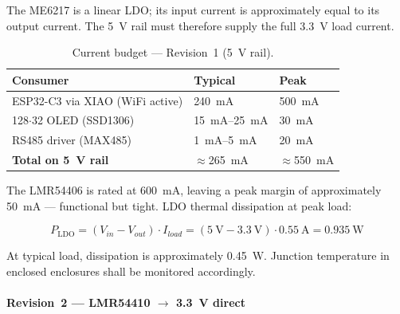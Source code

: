 The ME6217 is a linear \ac{LDO}; its input current is approximately equal to its output current.
The \SI{5}{\volt} rail must therefore supply the full \SI{3.3}{\volt} load current.

\begin{table}[H]
  \caption{Current budget — Revision~1 (\SI{5}{\volt} rail).}
  \label{tab:current_rev1}
  \centering
  \begin{tabularx}{\textwidth}{|X|X|X|}
    \hline
    \textbf{Consumer} & \textbf{Typical} & \textbf{Peak} \\ \hline \hline
    ESP32-C3 via XIAO (\ac{WiFi} active) & \SI{240}{\milli\ampere} & \SI{500}{\milli\ampere} \\ \hline
    128$\cdot$32 \ac{OLED} (SSD1306)  & \SI{15}{\milli\ampere}--\SI{25}{\milli\ampere} & \SI{30}{\milli\ampere} \\ \hline
    \ac{RS485} driver (MAX485)          & \SI{1}{\milli\ampere}--\SI{5}{\milli\ampere}   & \SI{20}{\milli\ampere} \\ \hline
    \hline
    \textbf{Total on \SI{5}{\volt} rail} & $\approx$\SI{265}{\milli\ampere} & $\approx$\SI{550}{\milli\ampere} \\ \hline
  \end{tabularx}
\end{table}

The LMR54406 is rated at \SI{600}{\milli\ampere}, leaving a peak margin of approximately
\SI{50}{\milli\ampere} — functional but tight. \ac{LDO} thermal dissipation at peak load:

\begin{equation}
  P_{\mathrm{LDO}} = (V_{in} - V_{out}) \cdot I_{load}
                   = (\SI{5}{\volt} - \SI{3.3}{\volt}) \cdot \SI{0.55}{\ampere}
                   = \SI{0.935}{\watt}
  \label{eq:ldo_dissipation}
\end{equation}

At typical load, dissipation is approximately \SI{0.45}{\watt}.
Junction temperature in enclosed enclosures shall be monitored accordingly.

\paragraph{Revision~2 — LMR54410 $\rightarrow$ \SI{3.3}{\volt} direct}

